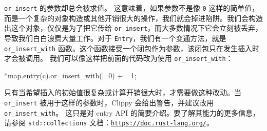 \texttt{or\_insert} 的参数却总会被求值。
\label{idx:idx_e5dfa927}
这意味着，如果参数不是像 \texttt{0} 这样的简单值，而是一个复杂的对象构造或其他开销很大的操作，我们就会掉进陷阱。我们会构造出这个对象，仅仅是为了把它传给 \texttt{or\_insert}，而大多数情况下它会立刻被丢弃，导致我们白白浪费大量工作。对于 \texttt{Entry}，我们有一个变通方法，就是 \texttt{or\_\allowbreak{}insert\_\allowbreak{}with} 函数。这个函数接受一个闭包作为参数，该闭包只在发生插入时才会被调用。
我们可以像这样把前面的代码改为使用 \texttt{or\_\allowbreak{}insert\_\allowbreak{}with}：
\begin{codebox}[text]
*map.entry(c).or_insert_with(|| 0) += 1;
\end{codebox}
只有当希望插入的初始值很复杂或计算开销很大时，才需要做这种改动。当 \texttt{or\_insert} 被用于这样的参数时，Clippy 会给出警告，并建议改用 \texttt{or\_\allowbreak{}insert\_\allowbreak{}with}。
这只是对 entry API 的简要介绍。要了解其能力的更多信息，请参阅 \texttt{std::\allowbreak{}collections} 文档：\href{https://doc.rust-lang.org/}{\texttt{https:/\allowbreak{}/\allowbreak{}doc.\allowbreak{}rust-\allowbreak{}lang.\allowbreak{}org/\allowbreak{}}}。
